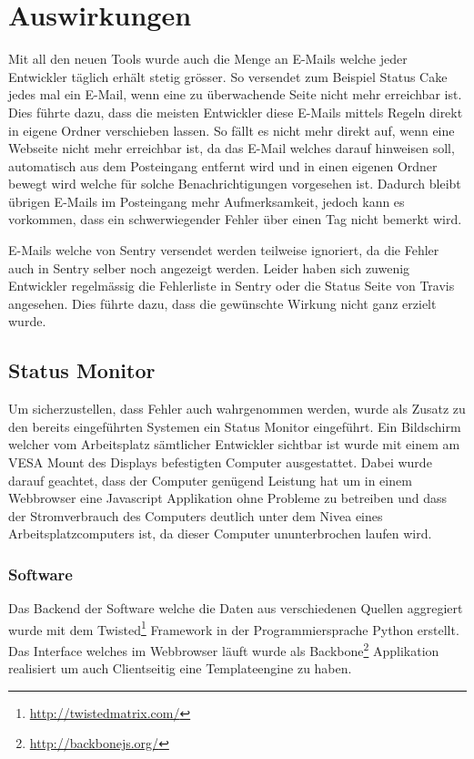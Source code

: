 \section{Auswirkungen}
\label{sec:auswirkungen}
Mit all den neuen Tools wurde auch die Menge an E-Mails welche jeder Entwickler täglich erhält stetig grösser. So versendet zum Beispiel Status Cake jedes mal ein E-Mail, wenn eine zu überwachende Seite nicht mehr erreichbar ist. Dies führte dazu, dass die meisten Entwickler diese E-Mails mittels Regeln direkt in eigene Ordner verschieben lassen. So fällt es nicht mehr direkt auf, wenn eine Webseite nicht mehr erreichbar ist, da das E-Mail welches darauf hinweisen soll, automatisch aus dem Posteingang entfernt wird und in einen eigenen Ordner bewegt wird welche für solche Benachrichtigungen vorgesehen ist. Dadurch bleibt übrigen E-Mails im Posteingang mehr Aufmerksamkeit, jedoch kann es vorkommen, dass ein schwerwiegender Fehler über einen Tag nicht bemerkt wird.

E-Mails welche von Sentry versendet werden teilweise ignoriert, da die Fehler auch in Sentry selber noch angezeigt werden. Leider haben sich zuwenig Entwickler regelmässig die Fehlerliste in Sentry oder die Status Seite von Travis angesehen. Dies führte dazu, dass die gewünschte Wirkung nicht ganz erzielt wurde.

\subsection{Status Monitor}
\label{sub:status_monitor}
Um sicherzustellen, dass Fehler auch wahrgenommen werden, wurde als Zusatz zu den bereits eingeführten Systemen ein Status Monitor eingeführt. Ein Bildschirm welcher vom Arbeitsplatz sämtlicher Entwickler sichtbar ist wurde mit einem am VESA Mount des Displays befestigten Computer ausgestattet. Dabei wurde darauf geachtet, dass der Computer genügend Leistung hat um in einem Webbrowser eine Javascript Applikation ohne Probleme zu betreiben und dass der Stromverbrauch des Computers deutlich unter dem Nivea eines Arbeitsplatzcomputers ist, da dieser Computer ununterbrochen laufen wird.

\subsubsection{Software}
\label{ssub:software}
Das Backend der Software welche die Daten aus verschiedenen Quellen aggregiert wurde mit dem Twisted\footnote{\url{http://twistedmatrix.com/}} Framework in der Programmiersprache Python erstellt. Das Interface welches im Webbrowser läuft wurde als Backbone\footnote{\url{http://backbonejs.org/}} Applikation realisiert um auch Clientseitig eine Templateengine zu haben.

